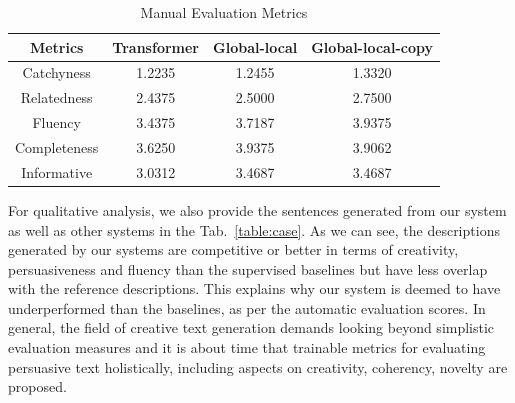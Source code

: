 \documentclass[sigconf]{acmart}
\begin{document}
\begin{table}
  \caption{Manual Evaluation Metrics}
  \label{table:evaluation-manual}
  \begin{tabular}{c c c c}
    \toprule
    Metrics & Transformer & Global-local & Global-local-copy\\
    \midrule
    Catchyness & 1.2235 & 1.2455 & 1.3320\\
    Relatedness & 2.4375 & 2.5000 & 2.7500\\
    Fluency & 3.4375 & 3.7187 & 3.9375\\
    Completeness & 3.6250 & 3.9375 & 3.9062\\
    Informative & 3.0312 & 3.4687 & 3.4687 \\
  \bottomrule
\end{tabular}
\end{table}

For qualitative analysis, we also provide the sentences generated from our system as well as other systems in the Tab.~\ref{table:case}. As we can see, the descriptions generated by our systems are competitive or better in terms of creativity, persuasiveness and fluency than the supervised baselines but have less overlap with the reference descriptions. This explains why our system is deemed to have underperformed than the baselines, as per the automatic evaluation scores. In general, the field of creative text generation demands looking beyond simplistic evaluation measures and it is about time that trainable metrics for evaluating persuasive text holistically, including aspects on creativity, coherency, novelty are proposed.
\end{document}
